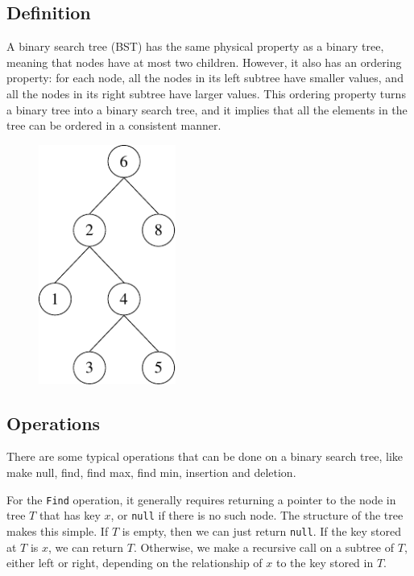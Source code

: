 \subsection{Definition}
\begin{minipage}{0.7\textwidth}
  A binary search tree (BST) has the same physical property as a binary tree, meaning that nodes have at most two children. However, it also has an ordering property: for each node, all the nodes in its left subtree have smaller values, and all the nodes in its right subtree have larger values. This ordering property turns a binary tree into a binary search tree, and it implies that all the elements in the tree can be ordered in a consistent manner.
\end{minipage}
\begin{minipage}{0.3\textwidth}
  \begin{figure}[H]
    \centering
    \includegraphics[width=0.4\textwidth]{Figure/BST.pdf}
  \end{figure}
\end{minipage}

\subsection{Operations}
There are some typical operations that can be done on a binary search tree, like make null, find, find max, find min, insertion and deletion. 

For the \verb|Find| operation, it generally requires returning a pointer to the node in tree \(T\) that has key \(x\), or \verb|null| if there is no such node. The structure of the tree makes this simple. If \(T\) is empty, then we can just return \verb|null|. If the key stored at \(T\) is \(x\), we can return \(T\). Otherwise, we make a recursive call on a subtree of \(T\), either left or right, depending on the relationship of \(x\) to the key stored in \(T\).

